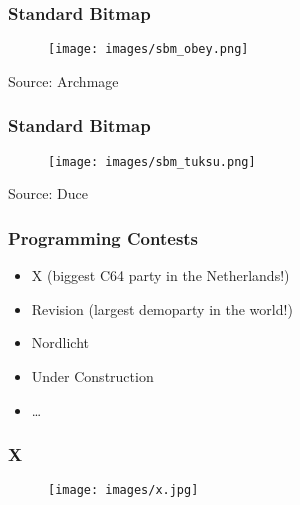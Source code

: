 \documentclass[aspectratio=43]{uva-inf-presentation}
\begin{document}

\begin{frame}
\frametitle{Standard Bitmap}

\begin{figure}
\texttt{[image: images/sbm\_obey.png]}
\end{figure}

\begin{center}
Source: Archmage
\end{center}

\end{frame}


\begin{frame}
\frametitle{Standard Bitmap}

\begin{figure}
\texttt{[image: images/sbm\_tuksu.png]}
\end{figure}

\begin{center}
Source: Duce
\end{center}

\end{frame}


\begin{frame}
\frametitle{Programming Contests}

\begin{itemize}
\item X (biggest C64 party in the Netherlands!)
\item Revision (largest demoparty in the world!)
\item Nordlicht
\item Under Construction
\item \dots
\end{itemize}

\end{frame}


\begin{frame}
\frametitle{X}

\begin{figure}
\texttt{[image: images/x.jpg]}
\end{figure}

\end{frame}
\end{document}

